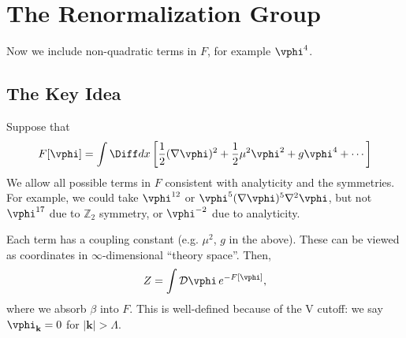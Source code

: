 \documentclass[12pt]{article}
\begin{document}
\newpage

\section{The Renormalization Group}%
\label{sec:renorm}

Now we include non-quadratic terms in $F$, for example $\vphi^{4}$.

\subsection{The Key Idea}%
\label{sub:key}

Suppose that
\[
	F[\vphi] = \int \Diff d x \left[ \frac{1}{2} (\nabla \vphi)^2 + \frac{1}{2} \mu^2 \vphi^2 + g \vphi^{4} + \cdots \right]
\]
We allow all possible terms in $F$ consistent with analyticity and the symmetries. For example, we could take $\vphi^{12}$ or $\vphi^{5}(\nabla \vphi)^{5} \nabla^2 \vphi$, but not $\vphi^{17}$ due to $\mathbb{Z}_2$ symmetry, or $\vphi^{-2}$ due to analyticity.

Each term has a coupling constant (e.g. $\mu^2$, $g$ in the above). These can be viewed as coordinates in $\infty$-dimensional ``theory space''. Then,
\[
	Z = \int \mathcal{D} \vphi \, e^{-F[\vphi]},
\]
where we absorb $\beta$ into $F$. This is well-defined because of the V cutoff: we say $\vphi_{\mathbf{k}} = 0$ for $|\mathbf{k}| > \Lambda$.
\end{document}

